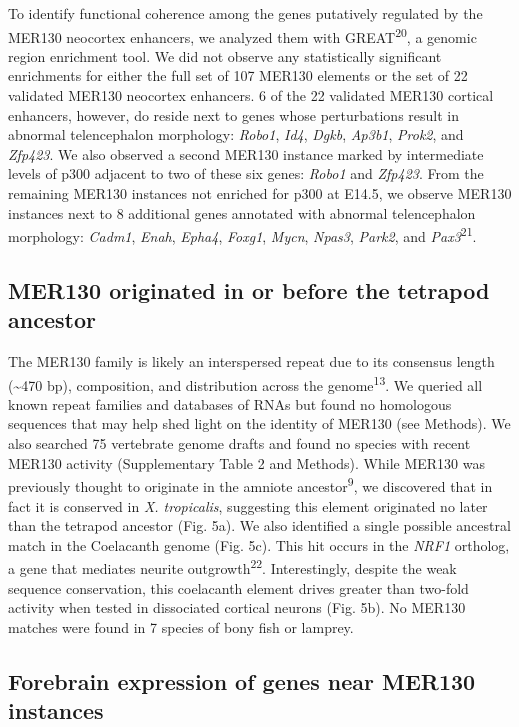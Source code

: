 \documentclass[]{article}
\begin{document}
To identify functional coherence among the genes putatively regulated by
the MER130 neocortex enhancers, we analyzed them with
GREAT\textsuperscript{20}, a genomic region enrichment tool. We did not
observe any statistically significant enrichments for either the full
set of 107 MER130 elements or the set of 22 validated MER130 neocortex
enhancers. 6 of the 22 validated MER130 cortical enhancers, however, do
reside next to genes whose perturbations result in abnormal
telencephalon morphology: \emph{Robo1}, \emph{Id4}, \emph{Dgkb},
\emph{Ap3b1}, \emph{Prok2}, and \emph{Zfp423}. We also observed a second
MER130 instance marked by intermediate levels of p300 adjacent to two of
these six genes: \emph{Robo1} and \emph{Zfp423}. From the remaining
MER130 instances not enriched for p300 at E14.5, we observe MER130
instances next to 8 additional genes annotated with abnormal
telencephalon morphology: \emph{Cadm1}, \emph{Enah}, \emph{Epha4},
\emph{Foxg1}, \emph{Mycn}, \emph{Npas3}, \emph{Park2}, and
\emph{Pax3}\textsuperscript{21}.

\subsection{MER130 originated in or before the tetrapod
ancestor}\label{mer130-originated-in-or-before-the-tetrapod-ancestor}

The MER130 family is likely an interspersed repeat due to its consensus
length (\textasciitilde{}470 bp), composition, and distribution across
the genome\textsuperscript{13}. We queried all known repeat families and
databases of RNAs but found no homologous sequences that may help shed
light on the identity of MER130 (see Methods). We also searched 75
vertebrate genome drafts and found no species with recent MER130
activity (Supplementary Table 2 and Methods). While MER130 was
previously thought to originate in the amniote
ancestor\textsuperscript{9}, we discovered that in fact it is conserved
in \emph{X. tropicalis}, suggesting this element originated no later
than the tetrapod ancestor (Fig. 5a). We also identified a single
possible ancestral match in the Coelacanth genome (Fig. 5c). This hit
occurs in the \emph{NRF1} ortholog, a gene that mediates neurite
outgrowth\textsuperscript{22}. Interestingly, despite the weak sequence
conservation, this coelacanth element drives greater than two-fold
activity when tested in dissociated cortical neurons (Fig. 5b). No
MER130 matches were found in 7 species of bony fish or lamprey.

\subsection{Forebrain expression of genes near MER130
instances}\label{forebrain-expression-of-genes-near-mer130-instances}
\end{document}
